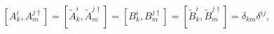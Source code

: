\begin{equation}
\left[ A_{k}^{i},A_{m}^{j\dagger }\right] =
\left[ \tilde{A}_{k}^{i},\tilde{A}_{m}^{j\dagger }\right] =
\left[ B_{k}^{i},B_{m}^{j\dagger }\right]=
\left[ \tilde{B}_{k}^{i},\tilde{B}_{m}^{j\dagger }\right]=
\delta _{km}\delta ^{ij},
\end{equation}


